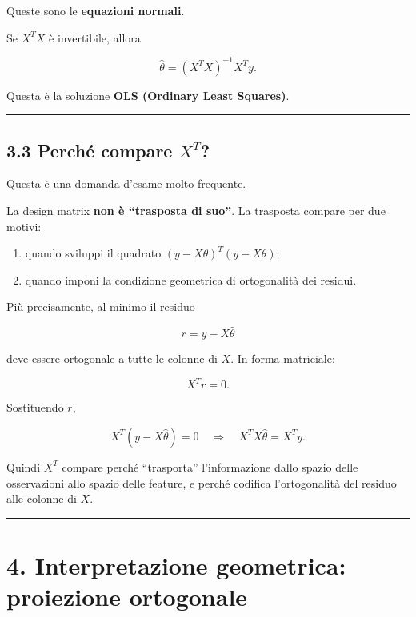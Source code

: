 \documentclass[
]{article}
\providecommand{\tightlist}{%
  \setlength{\itemsep}{0pt}\setlength{\parskip}{0pt}}
\begin{document}
Queste sono le \textbf{equazioni normali}.

Se \(X^TX\) è invertibile, allora

\[
\hat\theta = (X^TX)^{-1}X^Ty.
\]

Questa è la soluzione \textbf{OLS (Ordinary Least Squares)}.

\begin{center}\rule{0.5\linewidth}{0.5pt}\end{center}

\subsection{\texorpdfstring{3.3 Perché compare
\(X^T\)?}{3.3 Perché compare X\^{}T?}}\label{perchuxe9-compare-xt}

Questa è una domanda d'esame molto frequente.

La design matrix \textbf{non è ``trasposta di suo''}. La trasposta
compare per due motivi:

\begin{enumerate}
\def\labelenumi{\arabic{enumi}.}
\tightlist
\item
  quando sviluppi il quadrato \((y-X\theta)^T(y-X\theta)\);
\item
  quando imponi la condizione geometrica di ortogonalità dei residui.
\end{enumerate}

Più precisamente, al minimo il residuo

\[
r = y-X\hat\theta
\]

deve essere ortogonale a tutte le colonne di \(X\). In forma matriciale:

\[
X^Tr=0.
\]

Sostituendo \(r\),

\[
X^T(y-X\hat\theta)=0
\quad\Longrightarrow\quad
X^TX\hat\theta=X^Ty.
\]

Quindi \(X^T\) compare perché ``trasporta'' l'informazione dallo spazio
delle osservazioni allo spazio delle feature, e perché codifica
l'ortogonalità del residuo alle colonne di \(X\).

\begin{center}\rule{0.5\linewidth}{0.5pt}\end{center}

\section{4. Interpretazione geometrica: proiezione
ortogonale}\label{interpretazione-geometrica-proiezione-ortogonale}
\end{document}
